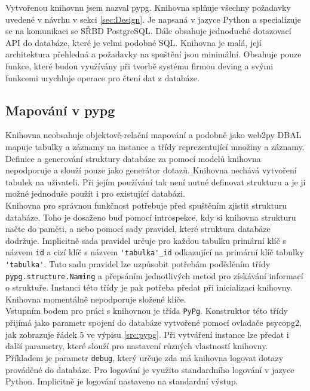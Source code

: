 \documentclass[ing,male,java,dept456]{diploma}						%
\begin{document}
Vytvořenou knihovnu jsem nazval pypg. Knihovna splňuje všechny požadavky uvedené v návrhu v sekci \ref{sec:Design}. Je napsaná v jazyce Python a specializuje se na komunikaci se SŘBD PostgreSQL. Dále obsahuje jednoduché dotazovací API do databáze, které je velmi podobné SQL. Knihovna je malá, její architektura přehledná a požadavky na spuštění jsou minimální. Obsahuje pouze funkce, které budou využívány při tvorbě systému firmou deving a svými funkcemi urychluje operace pro čtení dat z databáze. \\

\subsection{Mapování v pypg}

Knihovna neobsahuje objektově-relační mapování a podobně jako web2py DBAL mapuje tabulky a záznamy na instance a třídy reprezentující množiny a záznamy. \\
Definice a generování struktury databáze za pomocí modelů knihovna nepodporuje a slouží pouze jako generátor dotazů. Knihovna nechává vytvoření tabulek na uživateli. Při jejím používání tak není nutné definovat strukturu a je ji možné jednoduše použít i pro existující databázi. \\
Knihovna pro správnou funkčnost potřebuje před spuštěním zjistit strukturu databáze. Toho je dosaženo buď pomocí introspekce, kdy si knihovna strukturu načte do paměti, a nebo pomocí sady pravidel, které struktura databáze dodržuje. Implicitně sada pravidel určuje pro každou tabulku primární klíč s názvem \lstinline[style=inlinepython]|id| a cizí klíč s názvem \lstinline[style=inlinepython]|'tabulka'_id| odkazující na primární klíč tabulky \lstinline[style=inlinepython]|'tabulka'|. Tuto sadu pravidel lze uzpůsobit potřebám poděděním třídy \lstinline[style=inlinepython]|pypg.structure.Naming| a přepsáním jednotlivých metod pro získávání informací o struktuře. Instanci této třídy je pak potřeba předat při inicializaci knihovny. Knihovna momentálně nepodporuje složené klíče. \\
Vstupním bodem pro práci s knihovnou je třída \lstinline[style=inlinepython]|PyPg|. Konstruktor této třídy přijímá jako parametr spojení do databáze vytvořené pomocí ovladače psycopg2, jak zobrazuje řádek 5 ve výpisu \ref{src:pypg}. Při vytváření instance lze předat i další parametry, které slouží pro nastavení různých vlastností knihovny. Příkladem je parametr \lstinline[style=inlinepython]|debug|, který určuje zda má knihovna logovat dotazy prováděné do databáze. Pro logování je využito standardního logování v jazyce Python. Implicitně je logování nastaveno na standardní výstup. \\ 
\end{document}
